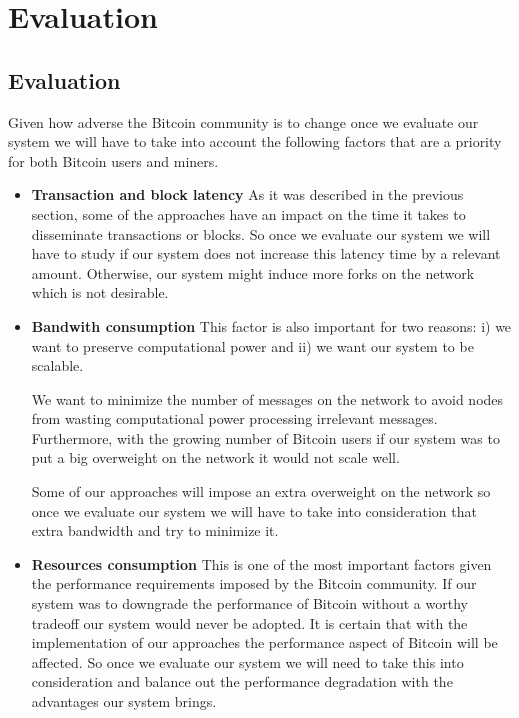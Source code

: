 \chapter{Evaluation}
\section{Evaluation}
\label{sec:evaluation}
Given how adverse the Bitcoin community is to change once we evaluate our system we will have to take into account the following factors that are a priority for both Bitcoin users and miners.

\begin{itemize}
\item \textbf{Transaction and block latency} As it was described in the previous section, some of the approaches have an impact on the time it takes to disseminate transactions or blocks. So once we evaluate our system we will have to study if our system does not increase this latency time by a relevant amount. Otherwise, our system might induce more forks on the network which is not desirable.

\item \textbf{Bandwith consumption} This factor is also important for two reasons: i) we want to preserve computational power and ii) we want our system to be scalable. 

We want to minimize the number of messages on the network to avoid nodes from wasting computational power processing irrelevant messages. Furthermore, with the growing number of Bitcoin users if our system was to put a big overweight on the network it would not scale well. 

Some of our approaches will impose an extra overweight on the network so once we evaluate our system we will have to take into consideration that extra bandwidth and try to minimize it.

\item \textbf{Resources consumption} This is one of the most important factors given the performance requirements imposed by the Bitcoin community. If our system was to downgrade the performance of Bitcoin without a worthy tradeoff our system would never be adopted. It is certain that with the implementation of our approaches the performance aspect of Bitcoin will be affected. So once we evaluate our system we will need to take this into consideration and balance out the performance degradation with the advantages our system brings.
\end{itemize}

